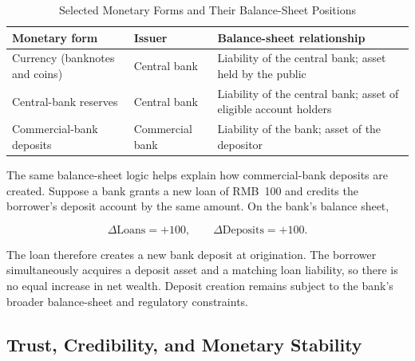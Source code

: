 \begin{table}[H]
\centering
\caption{Selected Monetary Forms and Their Balance-Sheet Positions}
\label{tab:ch2-money-claims}

\renewcommand{\arraystretch}{1.15}
\setlength{\tabcolsep}{7pt}

\begin{tabularx}{\textwidth}{
    @{}
    >{\raggedright\arraybackslash}p{3.35cm}
    >{\raggedright\arraybackslash}p{2.85cm}
    >{\raggedright\arraybackslash}X
    @{}
}
\toprule
\textbf{Monetary form}
& \textbf{Issuer}
& \textbf{Balance-sheet relationship} \\
\midrule

Currency\newline
{\small (banknotes and coins)}
& Central bank
& Liability of the central bank; asset held by the public \\
\addlinespace[0.3em]

Central-bank reserves
& Central bank
& Liability of the central bank; asset of eligible account holders \\
\addlinespace[0.3em]

Commercial-bank deposits
& Commercial bank
& Liability of the bank; asset of the depositor \\

\bottomrule
\end{tabularx}
\end{table}

The same balance-sheet logic helps explain how commercial-bank deposits are created. Suppose a bank grants a new loan of RMB~100 and credits the borrower's deposit account by the same amount. On the bank's balance sheet,

\begin{equation}
\Delta \text{Loans}=+100,
\qquad
\Delta \text{Deposits}=+100.
\label{eq:ch2-loan-deposit}
\end{equation}

The loan therefore creates a new bank deposit at origination. The borrower simultaneously acquires a deposit asset and a matching loan liability, so there is no equal increase in net wealth. Deposit creation remains subject to the bank's broader balance-sheet and regulatory constraints.

\subsection{Trust, Credibility, and Monetary Stability}

